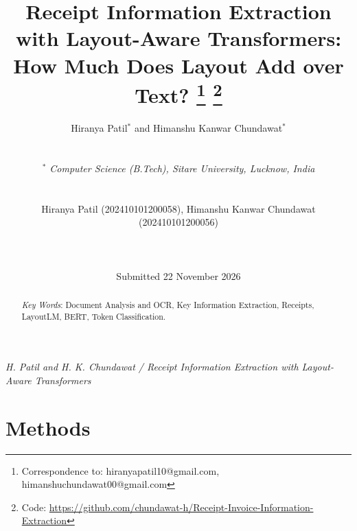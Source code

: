 \documentclass[twoside,a4paper,11pt]{article}
\title{Receipt Information Extraction with Layout-Aware Transformers:\\
How Much Does Layout Add over Text?
\footnote[0]{Correspondence to: hiranyapatil10@gmail.com, himanshuchundawat00@gmail.com \vspace{0.2cm}}
\footnote[0]{Code: \url{https://github.com/chundawat-h/Receipt-Invoice-Information-Extraction}}
}
\author{Hiranya Patil$^*$ and Himanshu Kanwar Chundawat$^*$ \\ \\
\centerline{\small \em $^*$ Computer Science (B.Tech), Sitare University, Lucknow, India} \\
\centerline{\small Hiranya Patil (202410101200058), Himanshu Kanwar Chundawat (202410101200056)} \\ \\
\centerline{\small Submitted 22 November 2026}
       }
\begin{document}
\maketitle

\pagestyle{myheadings}

         {\centerline{\small \it H. Patil and H. K. Chundawat /
           Receipt Information Extraction with Layout-Aware Transformers}}
\hrulefill

\begin{abstract}



\vspace{0.5cm}
\noindent
{\em Key Words}: Document Analysis and OCR, Key Information Extraction,
Receipts, LayoutLM, BERT, Token Classification.

\end{abstract}
\hrulefill






\section{Methods}
\label{sec:methods}










\end{document}
